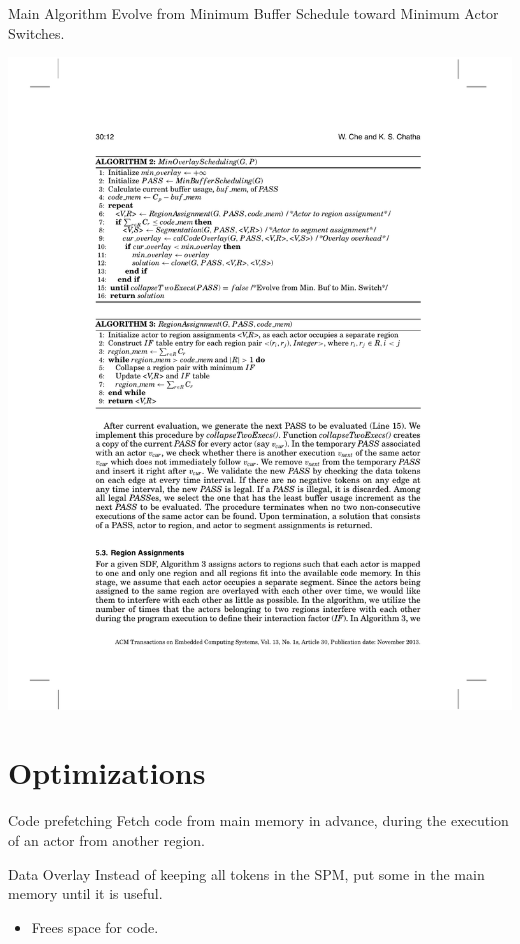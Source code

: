 \documentclass{beamer}
\begin{document}
\begin{frame}{Main Algorithm}
  Evolve from Minimum Buffer Schedule toward Minimum Actor Switches. %
  \begin{center}
    \hspace*{-0.1\textwidth}
    \includegraphics[width=1.2\textwidth]{algo2}
  \end{center}
\end{frame}


\section{Optimizations}

\begin{frame}{Code prefetching}
  Fetch code from main memory in advance, during the execution of an actor from another region.
\end{frame}

\begin{frame}{Data Overlay}
  Instead of keeping all tokens in the SPM, put some in the main memory until it is useful.
  \begin{itemize}
    \item Frees space for code.
  \end{itemize}
\end{frame}
\end{document}

